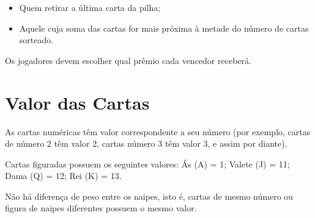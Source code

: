 \documentclass[12pt, a4paper]{article}
\begin{document}
\begin{itemize}
    \item Quem retirar a última carta da pilha;
    \item Aquele cuja soma das cartas for mais próxima à metade do número de cartas sorteado.
\end{itemize}

Os jogadores devem escolher qual prêmio cada vencedor receberá.

\section*{Valor das Cartas} \label{Valor das Cartas}
As cartas numéricas têm valor correspondente a seu número (por exemplo, cartas de número 2 têm valor 2, cartas número 3 têm valor 3, e assim por diante).

\medskip

Cartas figuradas possuem os seguintes valores: Ás (A) = 1; Valete (J) = 11; Dama (Q) = 12; Rei (K) = 13.

\medskip

Não há diferença de peso entre os naipes, isto é, cartas de mesmo número ou figura de naipes diferentes possuem o mesmo valor.
\end{document}

